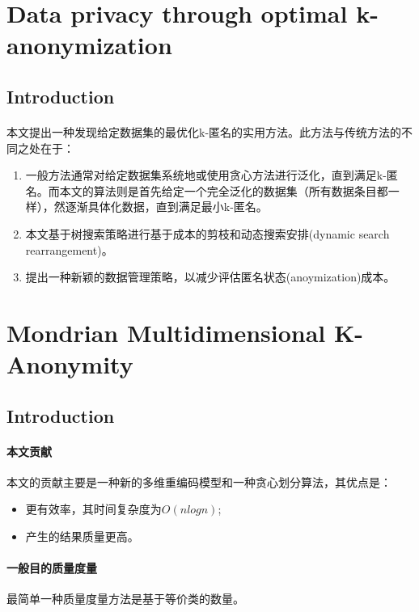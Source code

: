 \documentclass[12pt,a4paper]{article}
\begin{document}
\section{Data privacy through optimal k-anonymization\cite{bayardo2005} }
\subsection{Introduction}
\paragraph{} 本文提出一种发现给定数据集的最优化k-匿名的实用方法。此方法与传统方法的不同之处在于：
\begin{enumerate}
	\item 一般方法通常对给定数据集系统地或使用贪心方法进行泛化，直到满足k-匿名。而本文的算法则是首先给定一个完全泛化的数据集（所有数据条目都一样），然逐渐具体化数据，直到满足最小k-匿名。
	\item 本文基于树搜索策略进行基于成本的剪枝和动态搜索安排(dynamic search rearrangement)。
	\item 提出一种新颖的数据管理策略，以减少评估匿名状态(anoymization)成本。
\end{enumerate}











\section{Mondrian Multidimensional K-Anonymity\cite{mondrian} }
\subsection{Introduction}
\paragraph{本文贡献} 本文的贡献主要是一种新的多维重编码模型和一种贪心划分算法，其优点是：
	\begin{itemize}
		\item 更有效率，其时间复杂度为$O(nlogn)$;
		\item 产生的结果质量更高。
	\end{itemize}
\paragraph{一般目的质量度量} 最简单一种质量度量方法是基于等价类的数量。
\end{document}
